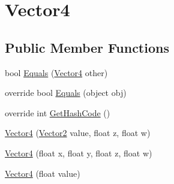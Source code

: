 \hypertarget{structMicrosoft_1_1Xna_1_1Framework_1_1Vector4}{}\section{Vector4}
\label{structMicrosoft_1_1Xna_1_1Framework_1_1Vector4}
\subsection*{Public Member Functions}
\begin{DoxyCompactItemize}
\item 
bool \hyperlink{structMicrosoft_1_1Xna_1_1Framework_1_1Vector4_a7cd992ffebc4b16153494fe4d40b5675}{Equals} (\hyperlink{structMicrosoft_1_1Xna_1_1Framework_1_1Vector4}{Vector4} other)
\item 
override bool \hyperlink{structMicrosoft_1_1Xna_1_1Framework_1_1Vector4_aadf763f0213fc2f3875230b06bb0b6cf}{Equals} (object obj)
\item 
override int \hyperlink{structMicrosoft_1_1Xna_1_1Framework_1_1Vector4_a77e1afa2b6dee1ed3640da81d7407b42}{Get\+Hash\+Code} ()
\item 
\hyperlink{structMicrosoft_1_1Xna_1_1Framework_1_1Vector4_a6884f1e84458037d73eaf7ad8021d748}{Vector4} (\hyperlink{structMicrosoft_1_1Xna_1_1Framework_1_1Vector2}{Vector2} value, float z, float w)
\item 
\hyperlink{structMicrosoft_1_1Xna_1_1Framework_1_1Vector4_a7a10bda557a2b9d5bc156f7b9aad1a3a}{Vector4} (float x, float y, float z, float w)
\item 
\hyperlink{structMicrosoft_1_1Xna_1_1Framework_1_1Vector4_ae93a59674eca8fab6262478609f39557}{Vector4} (float value)
\end{DoxyCompactItemize}
